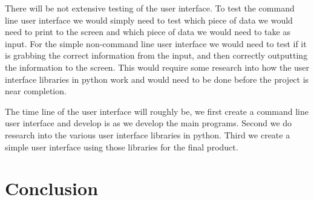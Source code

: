 \documentclass[onecolumn, draftclsnofoot,10pt, compsoc]{IEEEtran}
\begin{document}
There will be not extensive testing of the user interface. To test the command line user interface we would simply need to test which piece of data we would need to print to the screen and which piece of data we would need to take as input. For the simple non-command line user interface we would need to test if it is grabbing the correct information from the input, and then correctly outputting the information to the screen. This would require some research into how the user interface libraries in python work and would need to be done before the project is near completion.

The time line of the user interface will roughly be, we first create a command line user interface and develop is as we develop the main programs. Second we do research into the various user interface libraries in python. Third we create a simple user interface using those libraries for the final product.

\section{Conclusion}




\end{document}
